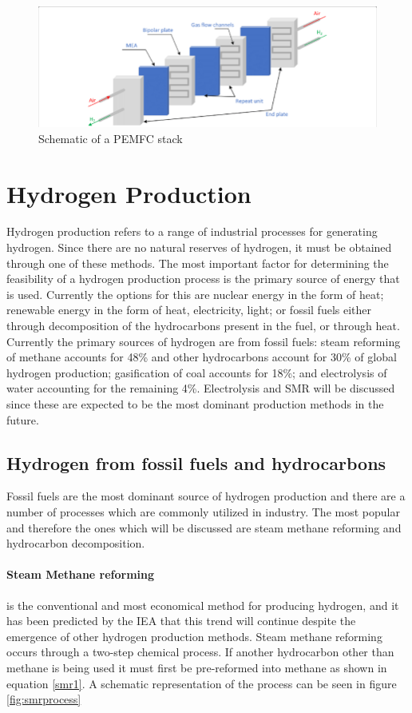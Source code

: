 \begin{figure}[H]
    \includegraphics[scale=0.5]{figures/PEMFCstack.png}
    \caption{Schematic of a PEMFC stack \cite{Li2019}}
    \label{fig:pemfcstack}
\end{figure}

\section{Hydrogen Production}
Hydrogen production refers to a range of industrial processes for generating hydrogen. 
Since there are no natural reserves of hydrogen, it must be obtained through one of these methods. The most important factor for determining the feasibility of a hydrogen production process is the primary source of energy that is used. Currently the options for this are nuclear energy in the form of heat; renewable energy in the form of heat, electricity, light; or fossil fuels either through decomposition of the hydrocarbons present in the fuel, or through heat. 
Currently the primary sources of hydrogen are from fossil fuels: steam reforming of methane accounts for 48\% and other hydrocarbons account for 30\% of global hydrogen production; gasification of coal accounts for 18\%; and electrolysis of water accounting for the remaining 4\%. \cite{Mangold2009} Electrolysis and SMR will be discussed since these are expected to be the most dominant production methods in the future. \cite{Holladay2009}

\subsection{Hydrogen from fossil fuels and hydrocarbons}
Fossil fuels are the most dominant source of hydrogen production \cite{Mangold2009} and there are a number of processes which are commonly utilized in industry. The most popular and therefore the ones which will be discussed are steam methane reforming and hydrocarbon decomposition.

\paragraph{Steam Methane reforming} is the conventional and most economical method for producing hydrogen, and it has been predicted by the 
IEA that this trend will continue despite the emergence of other hydrogen production methods. \cite{InternationalEnergyAgencyIEA2015}
Steam methane reforming occurs through a two-step chemical process. If another hydrocarbon other than methane is being used it must first be pre-reformed into methane as shown in equation \ref{smr1}. A schematic representation of the process can be seen in figure \ref{fig:smrprocess}

